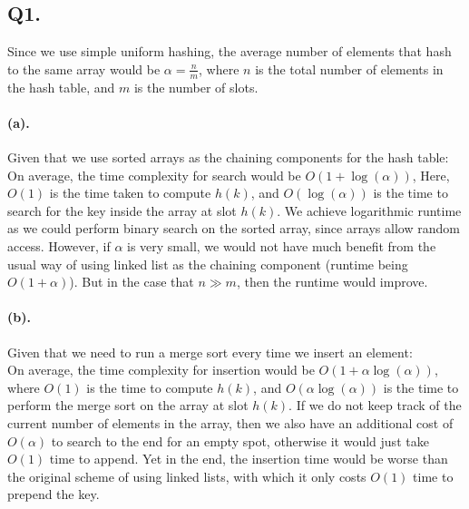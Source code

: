 \documentclass[12pt]{article}
\begin{document}
\subsection*{Q1.}
Since we use simple uniform hashing, the average number of elements that hash to the same array would be \(\alpha = \frac{n}{m}\), where \(n\) is the total number of elements in the hash table, and \(m\) is the number of slots.

\paragraph{(a).} Given that we use sorted arrays as the chaining components for the hash table:\\ On average, the time complexity for search would be \(O(1+\log(\alpha))\),  Here, \(O(1)\) is the time taken to compute \(h(k)\), and \(O(\log(\alpha))\) is the time to search for the key inside the array at slot \(h(k)\). We achieve logarithmic runtime as we could perform binary search on the sorted array, since arrays allow random access. However, if \(\alpha\) is very small, we would not have much benefit from the usual way of using linked list as the chaining component (runtime being \(O(1+\alpha)\)). But in the case that \(n \gg m\), then the runtime would improve.

\paragraph{(b).} Given that we need to run a merge sort every time we insert an element:\\
On average, the time complexity for insertion would be \(O(1+\alpha\log(\alpha))\), where \(O(1)\) is the time to compute \(h(k)\), and \(O(\alpha\log(\alpha))\) is the time to perform the merge sort on the array at slot \(h(k)\). If we do not keep track of the current number of elements in the array, then we also have an additional cost of \(O(\alpha)\) to search to the end for an empty spot, otherwise it would just take \(O(1)\) time to append. Yet in the end, the insertion time would be worse than the original scheme of using linked lists, with which it only costs \(O(1)\) time to prepend the key.
\end{document}
